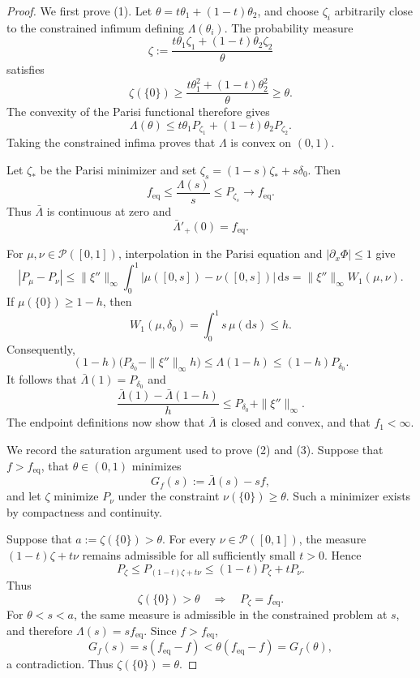\documentclass[a4paper,10pt,reqno]{amsart}
\numberwithin{equation}{section}
\newcommand{\mc}{\mathcal}
\newcommand{\dd}{\mathrm{d}}
\newcommand{\eq}{\mathrm{eq}}
\begin{document}
	\begin{proof}
		We first prove \textup{(1)}. Let
		\(\theta=t\theta_1+(1-t)\theta_2\), and choose \(\zeta_i\) arbitrarily
		close to the constrained infimum defining \(\Lambda(\theta_i)\). The
		probability measure
		\[
		\zeta
		:=
		\frac{t\theta_1\zeta_1+(1-t)\theta_2\zeta_2}{\theta}
		\]
		satisfies
		\[
		\zeta(\{0\})
		\ge
		\frac{t\theta_1^2+(1-t)\theta_2^2}{\theta}
		\ge\theta.
		\]
		The convexity of the Parisi functional therefore gives
		\[
		\Lambda(\theta)
		\le
		t\theta_1P_{\zeta_1}+(1-t)\theta_2P_{\zeta_2}.
		\]
		Taking the constrained infima proves that \(\Lambda\) is convex on
		\((0,1)\).
		
		Let \(\zeta_*\) be the Parisi minimizer and set
		\(\zeta_s=(1-s)\zeta_*+s\delta_0\). Then
		\[
		f_{\eq}
		\le\frac{\Lambda(s)}s
		\le P_{\zeta_s}
		\longrightarrow f_{\eq}.
		\]
		Thus \(\bar\Lambda\) is continuous at zero and
		\begin{equation}\label{eq:selected-right-slope-zero}
			\bar\Lambda'_+(0)=f_{\eq}.
		\end{equation}
		
		For \(\mu,\nu\in\mc P([0,1])\), interpolation in the Parisi equation
		and \(|\partial_x\Phi|\le1\) give
		\[
		|P_\mu-P_\nu|
		\le
		\|\xi''\|_\infty
		\int_0^1
		|\mu([0,s])-\nu([0,s])|\,\dd s
		=
		\|\xi''\|_\infty W_1(\mu,\nu).
		\]
		If \(\mu(\{0\})\ge1-h\), then
		\[
		W_1(\mu,\delta_0)=\int_0^1s\,\mu(\dd s)\le h.
		\]
		Consequently,
		\[
		(1-h)\bigl(P_{\delta_0}-\|\xi''\|_\infty h\bigr)
		\le\Lambda(1-h)
		\le(1-h)P_{\delta_0}.
		\]
		It follows that \(\bar\Lambda(1)=P_{\delta_0}\) and
		\[
		\frac{\bar\Lambda(1)-\bar\Lambda(1-h)}h
		\le P_{\delta_0}+\|\xi''\|_\infty.
		\]
		The endpoint definitions now show that \(\bar\Lambda\) is closed and
		convex, and that \(f_1<\infty\).
		
		We record the saturation argument used to prove \textup{(2)} and
		\textup{(3)}. Suppose that \(f>f_{\eq}\), that
		\(\theta\in(0,1)\) minimizes
		\[
		G_f(s):=\bar\Lambda(s)-sf,
		\]
		and let \(\zeta\) minimize \(P_\nu\) under the constraint
		\(\nu(\{0\})\ge\theta\). Such a minimizer exists by compactness and
		continuity.
		
		Suppose that \(a:=\zeta(\{0\})>\theta\). For every
		\(\nu\in\mc P([0,1])\), the measure
		\((1-t)\zeta+t\nu\) remains admissible for all sufficiently small
		\(t>0\). Hence
		\[
		P_\zeta
		\le P_{(1-t)\zeta+t\nu}
		\le(1-t)P_\zeta+tP_\nu.
		\]
		Thus
		\begin{equation}\label{eq:selected-slack-global}
			\zeta(\{0\})>\theta
			\quad\Longrightarrow\quad
			P_\zeta=f_{\eq}.
		\end{equation}
		For \(\theta<s<a\), the same measure is
		admissible in the constrained problem at \(s\), and therefore
		\(\Lambda(s)=sf_{\eq}\). Since \(f>f_{\eq}\),
		\[
		G_f(s)=s(f_{\eq}-f)
		<\theta(f_{\eq}-f)=G_f(\theta),
		\]
		a contradiction. Thus \(\zeta(\{0\})=\theta\).
		

\end{proof}
\end{document}
